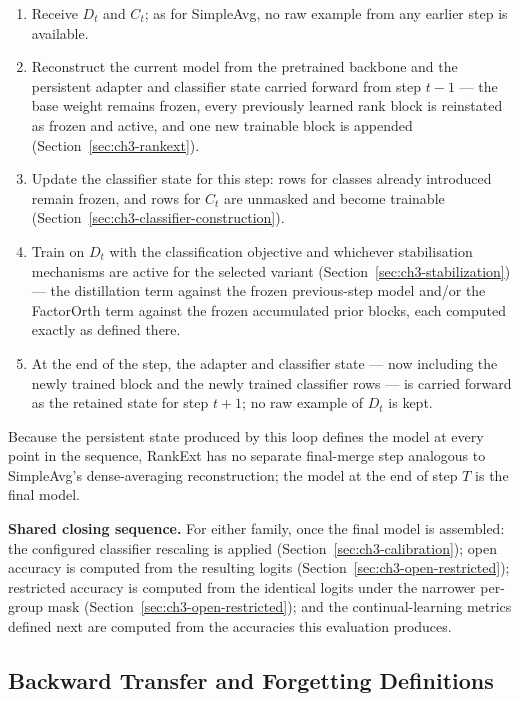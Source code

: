 \begin{enumerate}
\item Receive $D_t$ and $C_t$; as for SimpleAvg, no raw example from any
   earlier step is available.
\item Reconstruct the current model from the pretrained backbone and the
   persistent adapter and classifier state carried forward from step
   $t-1$ --- the base weight remains frozen, every previously learned rank
   block is reinstated as frozen and active, and one new trainable block is
   appended (Section~\ref{sec:ch3-rankext}).
\item Update the classifier state for this step: rows for classes already
   introduced remain frozen, and rows for $C_t$ are unmasked and become
   trainable (Section~\ref{sec:ch3-classifier-construction}).
\item Train on $D_t$ with the classification objective and whichever
   stabilisation mechanisms are active for the selected variant
   (Section~\ref{sec:ch3-stabilization}) --- the distillation term against
   the frozen previous-step model and/or the FactorOrth term against the
   frozen accumulated prior blocks, each computed exactly as defined there.
\item At the end of the step, the adapter and classifier state --- now
   including the newly trained block and the newly trained classifier rows
   --- is carried forward as the retained state for step $t+1$; no raw
   example of $D_t$ is kept.
\end{enumerate}

Because the persistent state produced by this loop defines the model at
every point in the sequence, RankExt has no separate final-merge step
analogous to SimpleAvg's dense-averaging reconstruction; the model at the
end of step $T$ is the final model.

\textbf{Shared closing sequence.} For either family, once the final model is
assembled: the configured classifier rescaling is applied
(Section~\ref{sec:ch3-calibration}); open accuracy is computed from the resulting logits
(Section~\ref{sec:ch3-open-restricted}); restricted accuracy is computed from the identical logits
under the narrower per-group mask (Section~\ref{sec:ch3-open-restricted}); and the continual-learning
metrics defined next are computed from the accuracies this evaluation
produces.

\subsection{Backward Transfer and Forgetting Definitions}
\label{sec:ch3-bwt-forgetting}


